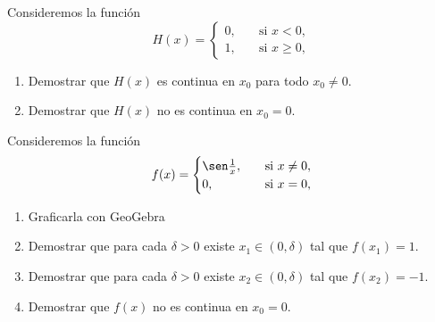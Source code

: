 \item 
Consideremos la función
\[
H(x) = \begin{cases}
    0, \quad &\text{si $x<0$},\\
    1, \quad &\text{si $x\ge0$},
\end{cases}
\]
\begin{enumerate}
    \item Demostrar que $H(x)$ es continua en $x_0$ para todo $x_0\neq 0$.
    \item Demostrar que $H(x)$ no es continua en $x_0=0$.
\end{enumerate}

\item \label{ej:sen1_x}
Consideremos la función 
\[
f(x) = \begin{cases}
    \sen \frac1x,\quad &\text{si $x\neq 0$},
    \\
    0,\quad &\text{si $x = 0$},
    \end{cases}
\]
\begin{enumerate}
    \item Graficarla con GeoGebra
    \item Demostrar que para cada $\delta>0$ existe $x_1\in(0,\delta)$ tal que $f(x_1)=1$.
    \item Demostrar que para cada $\delta>0$ existe $x_2\in(0,\delta)$ tal que $f(x_2)=-1$.
    \item Demostrar que $f(x)$ no es continua en $x_0=0$.
\end{enumerate}

